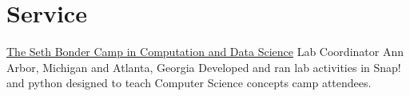 \section{Service}
		{\href{https://sethbondercamp.isye.gatech.edu/}{The Seth Bonder Camp in Computation and Data Science}}
		{Lab Coordinator}
		{Ann Arbor, Michigan and Atlanta, Georgia}{}
        {Developed and ran lab activities in Snap! and python designed to teach Computer Science concepts camp attendees.}
